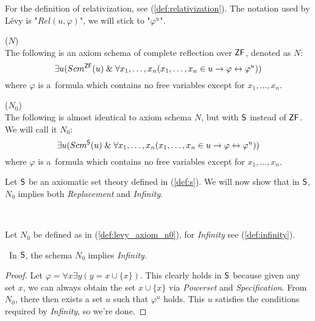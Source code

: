 For the definition of relativization, see (\ref{def:relativization}). The notation used by Lévy is "$Rel(u, \varphi)$", we will stick to "$\varphi^{u}$".
\begin{definition}{($N$)}\label{def:levy_axiom_n}\\
The following is an axiom schema of complete reflection over $\sf{ZF}$, denoted as $N$:
\begin{equation}
\exists u (Scm^{\sf{ZF}}(u) \mathrel{\&} \forall x_1, \ldots , x_n (x_1, \ldots , x_n \in u \rightarrow \varphi \leftrightarrow \varphi^{u}))
\end{equation}
where $\varphi$ is a~formula which contains no free variables except for $x_1, \ldots , x_n$.
\end{definition}

\begin{definition}{($N_0$)}\label{def:levy_axiom_n0}\\
The following is almost identical to axiom schema $N$, but with $\sf{S}$ instead of $\sf{ZF}$. We will call it $N_0$:
\begin{equation}
\exists u (Scm^{\sf{S}}(u) \mathrel{\&} \forall x_1, \ldots , x_n (x_1, \ldots , x_n \in u \rightarrow \varphi \leftrightarrow \varphi^{u}))
\end{equation}
where $\varphi$ is a~formula which contains no free variables except for $x_1, \ldots , x_n$.
\end{definition}

Let $\sf{S}$ be an axiomatic set theory defined in (\ref{def:s}). We will now show that in $\sf{S}$, $N_0$ implies both \emph{Replacement} and \emph{Infinity}.

\

Let $N_0$ be defined as in (\ref{def:levy_axiom_n0}), for \emph{Infinity} see (\ref{def:infinity}).
\begin{theorem}\
In $\sf{S}$, the schema $N_0$ implies \emph{Infinity}.
\end{theorem}

\begin{proof}
Let $\varphi = \forall x \exists y (y = x \cup \{x\})$. This clearly holds in $\sf{S}$ because given any set $x$, we can always obtain the set $x \cup \{x\}$ via \emph{Powerset} and \emph{Specification}.
From $N_0$, there then exists a set $u$ such that $\varphi^{u}$ holds. This $u$ satisfies the conditions required by \emph{Infinity}, so we're done.
\end{proof}


